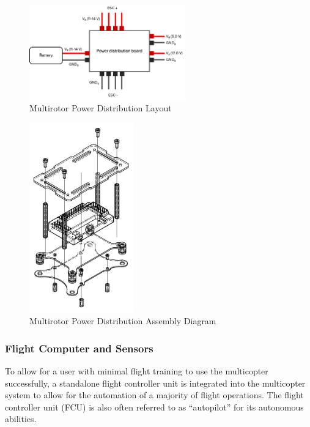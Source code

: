 \begin{figure}[h]
	\centering
	\includegraphics[width=0.6\textwidth]{img/pdb}
	\caption{Multirotor Power Distribution Layout}
	\label{fig:pdb}
\end{figure}

\begin{figure}[h]
	\centering
	\includegraphics[width=0.4\textwidth]{img/pdb2}
	\caption{Multirotor Power Distribution Assembly Diagram}
	\label{fig:pdb2}
\end{figure}

\subsubsection{Flight Computer and Sensors}
To allow for a user with minimal flight training to use the multicopter successfully, a standalone flight controller unit is integrated into the multicopter system to allow for the automation of a majority of flight operations. The flight controller unit (FCU) is also often referred to as ``autopilot'' for its autonomous abilities. 

